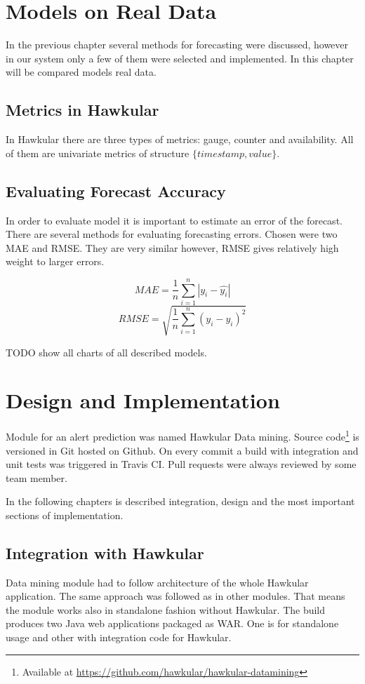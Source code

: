 \chapter{Models on Real Data}
In the previous chapter several methods for forecasting were discussed, however
in our system only a few of them were selected and implemented. In this chapter 
will be compared models real data.

    \section{Metrics in Hawkular}
    In Hawkular there are three types of metrics: gauge, counter and availability. 
    All of them are univariate metrics of structure $ \{timestamp, value\} $.

    \section{Evaluating Forecast Accuracy}
    In order to evaluate model it is important to estimate an error of the forecast. There are 
    several methods for evaluating forecasting errors. Chosen were two MAE and RMSE. They are 
    very similar however, RMSE gives relatively high weight to larger errors.

    $$ MAE = \frac{1}{n} \sum_{i=1}^{n} |y_i - \hat{y_i}| $$
    $$ RMSE = \sqrt{\frac{1}{n} \sum_{i=1}^{n}(y_i - \hat{y_i})^2} $$

    TODO show all charts of all described models. 

\chapter{Design and Implementation}
Module for an alert prediction was named Hawkular Data mining. Source
code\footnote{Available at \url{https://github.com/hawkular/hawkular-datamining}} is versioned in Git
hosted on Github. On every commit a build with integration and unit tests was triggered in
Travis CI. Pull requests were always reviewed by some team member.

In the following chapters is described integration, design and the most important
sections of implementation.

    \section{Integration with Hawkular}  
    Data mining module had to follow architecture of the whole Hawkular application.
    The same approach was followed as in other modules. That means the module 
    works also in standalone fashion without Hawkular. The build produces two Java
    web applications packaged as WAR. One is for standalone usage and other with
    integration code for Hawkular.

